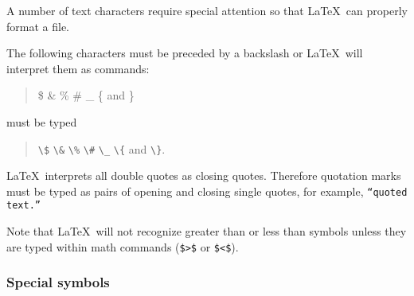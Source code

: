 A number of text characters require special attention so that \LaTeX\ can
properly format a file.

The following characters must be preceded by a backslash or \LaTeX\ will
interpret them as commands:
\begin{quote}
\$ \& \% \# \_ \{ and \}
\end{quote}
must be typed
\begin{center}
\begin{quote}
\verb"\$" \verb"\&" \verb"\%" \verb"\#" \verb"\_" \verb"\{" and \verb"\}".
\end{quote}
\end{center}

\LaTeX\ interprets all double quotes as closing quotes. Therefore quotation
marks must be typed as pairs of opening and closing single quotes, for example,
\texttt{``quoted text.''}

Note that \LaTeX\ will not recognize greater than or less than symbols unless
they are typed within math commands (\verb"$>$" or \verb"$<$").

\subsubsection{Special symbols}


